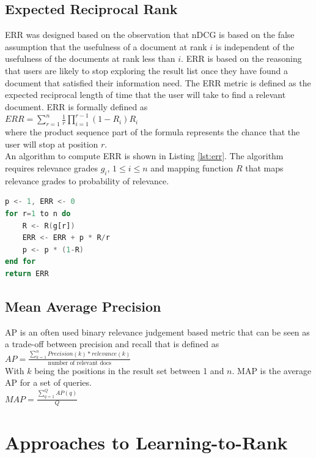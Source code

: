 \section{Expected Reciprocal Rank}
\ac{ERR}\cite{Chapelle2009} was designed based on the observation that \ac{nDCG} is based on the false assumption that the usefulness of a document at rank $i$ is independent of the usefulness of the documents at rank less than $i$. \ac{ERR} is based on the reasoning that users are likely to stop exploring the result list once they have found a document that satisfied their information need. The \ac{ERR} metric is defined as the expected reciprocal length of time that the user will take to find a relevant document. \ac{ERR} is formally defined as\\
$ERR = \sum\nolimits_{r=1}^n \frac{1}{r} \prod\nolimits_{i=1}^{r-1}(1-R_i)R_i$\\
where the product sequence part of the formula represents the chance that the user will stop at position $r$.\\
An algorithm to compute \ac{ERR} is shown in Listing \ref{lst:err}. The algorithm requires relevance grades $g_i$, $1 \le i \le n$ and mapping function $R$ that maps relevance grades to probability of relevance.
\begin{lstlisting}[caption={Algorithm to compute the ERR metric, obtained from \cite{Chapelle2009}}, label={lst:err},language=Ada]
p <- 1, ERR <- 0
for r=1 to n do
	R <- R(g[r])
	ERR <- ERR + p * R/r
	p <- p * (1-R)
end for
return ERR
\end{lstlisting}
\section{Mean Average Precision}
\ac{AP}\cite{Zhu2004} is an often used binary relevance judgement based metric that can be seen as a trade-off between precision and recall that is defined as\\
$AP = \frac{\sum\nolimits_{k=1}^{n}Precision(k)*relevance(k)}{\text{number of relevant docs}}$\\
With $k$ being the positions in the result set between 1 and $n$.
\ac{MAP} is the average \ac{AP} for a set of queries.\\
$MAP = \frac{\sum\nolimits_{q=1}^{Q}AP(q)}{Q}$

\chapter{Approaches to Learning-to-Rank}
